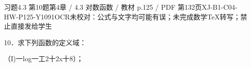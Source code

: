 \begin{bankitem}{习题4.3 第10题}{第4章 / 4.3 对数函数 / 教材 p.125 / PDF 第132页}{XJ-B1-C04-HW-P125-Y1091}{OCR未校对：公式与文字均可能有误；未完成数学TeX转写；禁止直接发给学生}
\begin{ocrdraft}
\par
10．求下列函数的定义域：
\par
（I)一log一工2十2x十8）；
\end{ocrdraft}
\end{bankitem}
